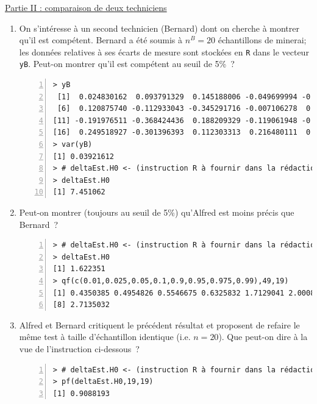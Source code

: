 \documentclass[10pt]{report}
\begin{document}
\begin{exercice}
\begin{enumerate}
\end{enumerate}

\noindent \underline{Partie II : comparaison de deux techniciens} \\

\begin{enumerate}

\item On s'intéresse à un second technicien (Bernard) dont on cherche à montrer qu'il est compétent. Bernard a été soumis à $n^B=20$ échantillons de minerai; les données relatives à ses écarts de mesure sont stockées en \texttt{R} dans le vecteur \texttt{yB}. Peut-on montrer qu'il est compétent au seuil de 5\%~?


\IndicR
\begin{Verbatim}[frame=leftline,fontfamily=tt,fontshape=n,numbers=left]
> yB
 [1]  0.024830162  0.093791329  0.145188006 -0.049699994 -0.153214255
 [6]  0.120875740 -0.112933043 -0.345291716 -0.007106278  0.122016115
[11] -0.191976511 -0.368424436  0.188209329 -0.119061948 -0.202052804
[16]  0.249518927 -0.301396393  0.112303313  0.216480111  0.239335084
> var(yB)
[1] 0.03921612
> # deltaEst.H0 <- (instruction R à fournir dans la rédaction)
> deltaEst.H0
[1] 7.451062
\end{Verbatim}




\item Peut-on montrer (toujours au seuil de 5\%) qu'Alfred est moins précis que Bernard~?


\IndicR
\begin{Verbatim}[frame=leftline,fontfamily=tt,fontshape=n,numbers=left]
> # deltaEst.H0 <- (instruction R à fournir dans la rédaction)
> deltaEst.H0
[1] 1.622351
> qf(c(0.01,0.025,0.05,0.1,0.9,0.95,0.975,0.99),49,19)
[1] 0.4350385 0.4954826 0.5546675 0.6325832 1.7129041 2.0008646 2.2983466
[8] 2.7135032
\end{Verbatim}





\item Alfred et Bernard critiquent le précédent résultat et proposent de refaire le même test à taille d'échantillon identique (i.e. $n=20$). Que peut-on dire à la vue de l'instruction ci-dessous~?

\IndicR
\begin{Verbatim}[frame=leftline,fontfamily=tt,fontshape=n,numbers=left]
> # deltaEst.H0 <- (instruction R à fournir dans la rédaction)
> pf(deltaEst.H0,19,19)
[1] 0.9088193
\end{Verbatim}





\end{enumerate}
\end{exercice}
\end{document}
